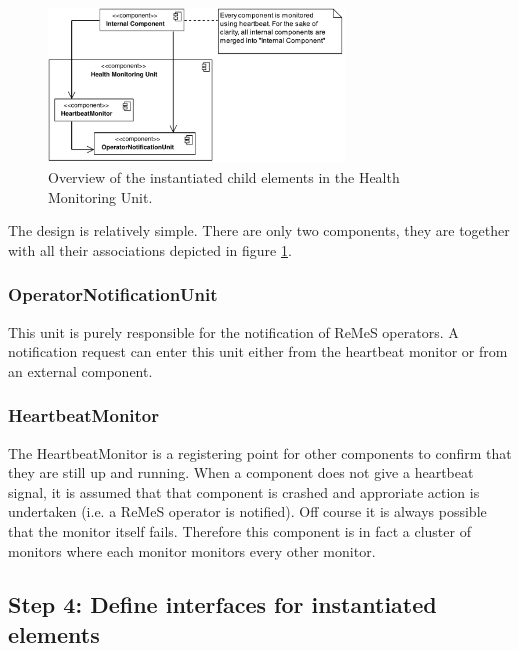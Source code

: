\begin{figure}[H]
	\begin{centering}
		\includegraphics[width=0.7\textwidth]{figs/add-it9-elements.pdf}
		\caption{Overview of the instantiated child elements in the Health Monitoring
		Unit.}
		\label{fig:it9/elements}
	\end{centering}
\end{figure}

\npar The design is relatively simple. There are only two components, they are
together with all their associations depicted in figure \ref{fig:it9/elements}.

\subsubsection{OperatorNotificationUnit}

\npar This unit is purely responsible for the notification of ReMeS operators. A
notification request can enter this unit either from the heartbeat monitor or
from an external component.

\subsubsection{HeartbeatMonitor}

\npar The HeartbeatMonitor is a registering point for other components to
confirm that they are still up and running. When a component does not give a
heartbeat signal, it is assumed that that component is crashed and approriate
action is undertaken (i.e. a ReMeS operator is notified). Off course it is
always possible that the monitor itself fails. Therefore this component is in
fact a cluster of monitors where each monitor monitors every other monitor.

\subsection{Step 4: Define interfaces for instantiated elements}
\label{add:it9/interfaces}

